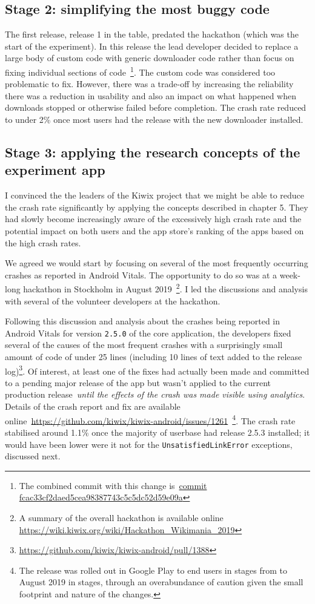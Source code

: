 \subsection{Stage 2: simplifying the most buggy code}
The first release, release 1 in the table, predated the hackathon (which was the start of the experiment). In this release the lead developer decided to replace a large body of custom code with generic downloader code rather than focus on fixing individual sections of code~\footnote{The combined commit with this change is~\href{https://github.com/kiwix/kiwix-android/commit/fcac33cf2daed5cea98387743c5c5dc52d59e09a}{commit fcac33cf2daed5cea98387743c5c5dc52d59e09a}}. The custom code was considered too problematic to fix. However, there was a trade-off by increasing the reliability there was a reduction in usability and also an impact on what happened when downloads stopped or otherwise failed before completion. The crash rate reduced to under 2\% once most users had the release with the new downloader installed.

\subsection{Stage 3: applying the research concepts of the experiment app}
I convinced the the leaders of the Kiwix project that we might be able to reduce the crash rate significantly by applying the concepts described in chapter 5. They had slowly become increasingly aware of the excessively high crash rate and the potential impact on both users and the app store's ranking of the apps based on the high crash rates. 

We agreed we would start by focusing on several of the most frequently occurring crashes as reported in Android Vitals. The opportunity to do so was at a week-long hackathon in Stockholm in August 2019~\footnote{A summary of the overall hackathon is available online \url{https://wiki.kiwix.org/wiki/Hackathon_Wikimania_2019}}. I led the discussions and analysis with several of the volunteer developers at the hackathon.

Following this discussion and analysis about the crashes being reported in Android Vitals for version \texttt{2.5.0} of the core application, the developers fixed several of the causes of the most frequent crashes with a surprisingly small amount of code of under 25 lines (including 10 lines of text added to the release log)\footnote{\url{https://github.com/kiwix/kiwix-android/pull/1388}}. Of interest, at least one of the fixes had actually been made and committed to a pending major release of the app but wasn't applied to the current production release~\emph{until the effects of the crash was made visible using analytics}. Details of the crash report and fix are available online~\url{https://github.com/kiwix/kiwix-android/issues/1261}~\footnote{The release was rolled out in Google Play to end users in stages from  to  August 2019 in stages, through an overabundance of caution given the small footprint and nature of the changes.}. The crash rate stabilised around 1.1\% once the majority of userbase had release 2.5.3 installed; it would have been lower were it not for the \texttt{UnsatisfiedLinkError} exceptions, discussed next.

